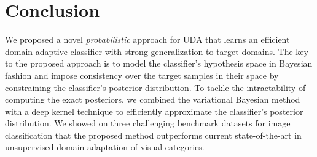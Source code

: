 \documentclass[10pt,letterpaper]{article}
\begin{document}
\section{Conclusion}\label{sec:conclusion}
We proposed a novel {\it probabilistic} approach for UDA that learns an efficient domain-adaptive classifier with strong generalization to target domains. The key to the proposed approach is to model the classifier's hypothesis space in Bayesian fashion and impose consistency over the target samples in their space by constraining the classifier's posterior distribution. To tackle the intractability of computing the exact posteriors, we combined the variational Bayesian method with a deep kernel technique to efficiently approximate the classifier's posterior distribution. We showed on three challenging benchmark datasets for image classification that the proposed method outperforms current state-of-the-art in unsupervised domain adaptation of visual categories.







\begin{comment}

\begin{figure}[t]
\begin{center}
\fbox{\rule{0pt}{2in} \rule{0.9\linewidth}{0pt}}
\end{center}
   \caption{Example of caption.  It is set in Roman so that mathematics
   (always set in Roman: ) may be included without an
   ugly clash.}
\label{fig:long}
\label{fig:onecol}
\end{figure}


\noindent
Compare the following:\\
\begin{tabular}{ll}
 \verb'' &   \\
 \verb'' & 
\end{tabular}\\


\begin{figure*}
\begin{center}
\fbox{\rule{0pt}{2in} \rule{.9\linewidth}{0pt}}
\end{center}
   \caption{Example of a short caption, which should be centered.}
\label{fig:short}
\end{figure*}


\begin{table}
\begin{center}
\begin{tabular}{|l|c|}
\hline
Method & Frobnability \\
\hline\hline
Theirs & Frumpy \\
Yours & Frobbly \\
Ours & Makes one's heart Frob\\
\hline
\end{tabular}
\end{center}
\caption{Results.   Ours is better.}
\end{table}


\end{comment}
\end{document}
